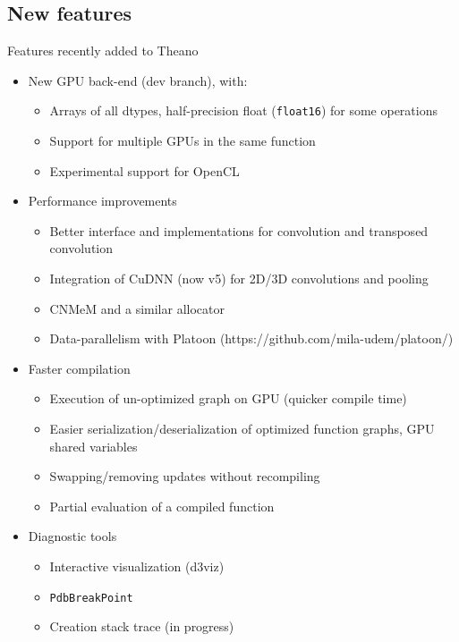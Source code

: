 \documentclass[a4paper,9pt]{beamer}
\begin{document}
\subsection{New features}
\begin{frame}[fragile]{Features recently added to Theano}
  \begin{itemize}
    \item New GPU back-end (dev branch), with:
      \begin{itemize}
        \item Arrays of all dtypes, half-precision float (\verb|float16|) for some operations
        \item Support for multiple GPUs in the same function
        \item Experimental support for OpenCL
      \end{itemize}
    \item Performance improvements
      \begin{itemize}
        \item Better interface and implementations for convolution and transposed convolution
        \item Integration of CuDNN (now v5) for 2D/3D convolutions and pooling
        \item CNMeM and a similar allocator
        \item Data-parallelism with Platoon (https://github.com/mila-udem/platoon/)
      \end{itemize}
    \item Faster compilation
      \begin{itemize}
        \item Execution of un-optimized graph on GPU (quicker compile time)
        \item Easier serialization/deserialization of optimized function graphs, GPU shared variables
        \item Swapping/removing updates without recompiling
        \item Partial evaluation of a compiled function
      \end{itemize}
    \item Diagnostic tools
      \begin{itemize}
        \item Interactive visualization (d3viz)
        \item \verb|PdbBreakPoint|
        \item Creation stack trace (in progress)
      \end{itemize}
  \end{itemize}
\end{frame}
\end{document}
